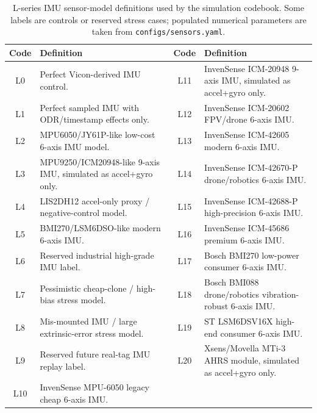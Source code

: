 \documentclass[11pt,a4paper]{article}
\begin{document}
\begin{table}[H]
\centering
\caption{L-series IMU sensor-model definitions used by the simulation codebook. Some labels are controls or reserved stress cases; populated numerical parameters are taken from \texttt{configs/sensors.yaml}.}
\label{tab:app_imu_l_models}
\scriptsize
\begin{tabularx}{\textwidth}{c X c X}
\toprule
{Code} & {Definition} & {Code} & {Definition} \\
\midrule
L0  & Perfect Vicon-derived IMU control. &
L11 & InvenSense ICM-20948 9-axis IMU, simulated as accel+gyro only. \\
L1  & Perfect sampled IMU with ODR/timestamp effects only. &
L12 & InvenSense ICM-20602 FPV/drone 6-axis IMU. \\
L2  & MPU6050/JY61P-like low-cost 6-axis IMU model. &
L13 & InvenSense ICM-42605 modern 6-axis IMU. \\
L3  & MPU9250/ICM20948-like 9-axis IMU, simulated as accel+gyro only. &
L14 & InvenSense ICM-42670-P drone/robotics 6-axis IMU. \\
L4  & LIS2DH12 accel-only proxy / negative-control model. &
L15 & InvenSense ICM-42688-P high-precision 6-axis IMU. \\
L5  & BMI270/LSM6DSO-like modern 6-axis IMU. &
L16 & InvenSense ICM-45686 premium 6-axis IMU. \\
L6  & Reserved industrial high-grade IMU label. &
L17 & Bosch BMI270 low-power consumer 6-axis IMU. \\
L7  & Pessimistic cheap-clone / high-bias stress model. &
L18 & Bosch BMI088 drone/robotics vibration-robust 6-axis IMU. \\
L8  & Mis-mounted IMU / large extrinsic-error stress model. &
L19 & ST LSM6DSV16X high-end consumer 6-axis IMU. \\
L9  & Reserved future real-tag IMU replay label. &
L20 & Xsens/Movella MTi-3 AHRS module, simulated as accel+gyro only. \\
L10 & InvenSense MPU-6050 legacy cheap 6-axis IMU. &
     &  \\
\bottomrule
\end{tabularx}
\end{table}
\end{document}
